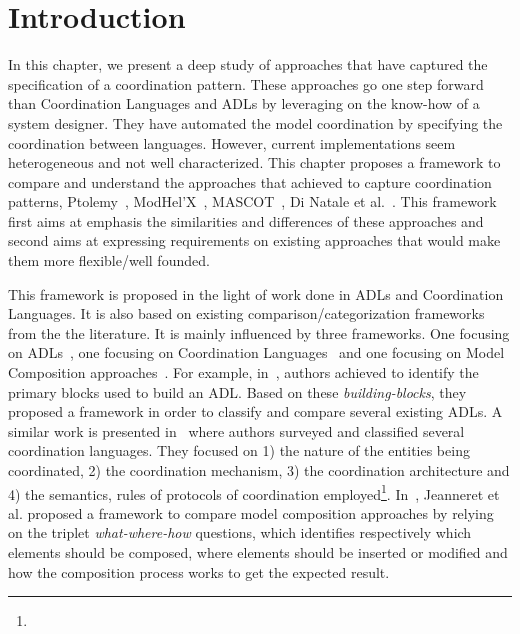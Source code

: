 \section{Introduction}
In this chapter, we present a deep study of approaches that have captured the specification of a coordination pattern. These approaches go one step forward than Coordination Languages and ADLs by leveraging on the know-how of a system designer. They have automated the model coordination by specifying the coordination between languages. However, current implementations seem heterogeneous and not well characterized. This chapter proposes a framework to compare and understand the approaches that achieved to capture coordination patterns, \ie Ptolemy~\cite{ptoleframebib}, ModHel'X~\cite{modhelxbib}, MASCOT~\cite{mascotbib}, Di Natale et al.~\cite{dinatale}. This framework first aims at emphasis the similarities and differences of these approaches and second aims at expressing requirements on existing approaches that would make them more flexible/well founded.

This framework is proposed in the light of work done in ADLs and Coordination Languages. It is also based on existing comparison/categorization frameworks from the the literature. It is mainly influenced by three frameworks. One focusing on ADLs~\cite{frameadlsbib}, one focusing on Coordination Languages~\cite{coordmodels} and one focusing on Model Composition approaches~\cite{framecompoas}. For example, in~\cite{frameadlsbib}, authors achieved to identify the primary blocks used to build an ADL. Based on these \emph{building-blocks}, they proposed a framework in order to classify and compare several existing ADLs. A similar work is presented in~\cite{coordmodels} where authors surveyed and classified several coordination languages. They focused on 1) the nature of the entities being coordinated, 2) the coordination mechanism, 3) the coordination architecture and 4) {\color{red}the semantics, rules of protocols of coordination employed}\footnote{}. In~\cite{framecompoas}, Jeanneret et al. proposed a framework to compare model composition approaches by relying on the triplet \emph{what-where-how} questions, which identifies respectively which elements should be composed, where elements should be inserted or modified and how the composition process works to get the expected result. 



